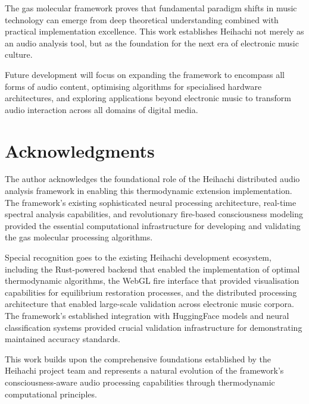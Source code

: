 \documentclass[12pt,a4paper]{article}
\begin{document}
The gas molecular framework proves that fundamental paradigm shifts in music technology can emerge from deep theoretical understanding combined with practical implementation excellence. This work establishes Heihachi not merely as an audio analysis tool, but as the foundation for the next era of electronic music culture.

Future development will focus on expanding the framework to encompass all forms of audio content, optimising algorithms for specialised hardware architectures, and exploring applications beyond electronic music to transform audio interaction across all domains of digital media.

\section*{Acknowledgments}

The author acknowledges the foundational role of the Heihachi distributed audio analysis framework in enabling this thermodynamic extension implementation. The framework's existing sophisticated neural processing architecture, real-time spectral analysis capabilities, and revolutionary fire-based consciousness modeling provided the essential computational infrastructure for developing and validating the gas molecular processing algorithms.

Special recognition goes to the existing Heihachi development ecosystem, including the Rust-powered backend that enabled the implementation of optimal thermodynamic algorithms, the WebGL fire interface that provided visualisation capabilities for equilibrium restoration processes, and the distributed processing architecture that enabled large-scale validation across electronic music corpora. The framework's established integration with HuggingFace models and neural classification systems provided crucial validation infrastructure for demonstrating maintained accuracy standards.

This work builds upon the comprehensive foundations established by the Heihachi project team and represents a natural evolution of the framework's consciousness-aware audio processing capabilities through thermodynamic computational principles.



\end{document}
